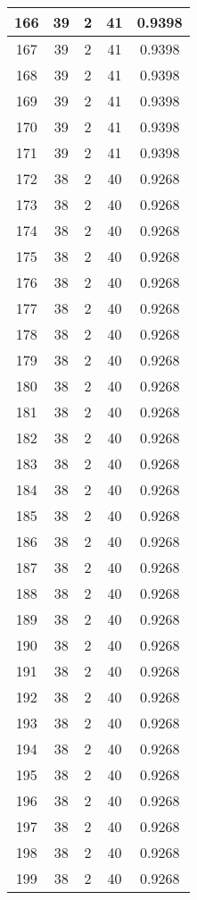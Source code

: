 \documentclass[letterpaper, 12pt]{article}
\begin{document}
\begin{longtable}{|c|c|c|c|c|}
\hline
166 & 39 & 2 & 41 & 0.9398 \\
\hline
167 & 39 & 2 & 41 & 0.9398 \\
\hline
168 & 39 & 2 & 41 & 0.9398 \\
\hline
169 & 39 & 2 & 41 & 0.9398 \\
\hline
170 & 39 & 2 & 41 & 0.9398 \\
\hline
171 & 39 & 2 & 41 & 0.9398 \\
\hline
172 & 38 & 2 & 40 & 0.9268 \\
\hline
173 & 38 & 2 & 40 & 0.9268 \\
\hline
174 & 38 & 2 & 40 & 0.9268 \\
\hline
175 & 38 & 2 & 40 & 0.9268 \\
\hline
176 & 38 & 2 & 40 & 0.9268 \\
\hline
177 & 38 & 2 & 40 & 0.9268 \\
\hline
178 & 38 & 2 & 40 & 0.9268 \\
\hline
179 & 38 & 2 & 40 & 0.9268 \\
\hline
180 & 38 & 2 & 40 & 0.9268 \\
\hline
181 & 38 & 2 & 40 & 0.9268 \\
\hline
182 & 38 & 2 & 40 & 0.9268 \\
\hline
183 & 38 & 2 & 40 & 0.9268 \\
\hline
184 & 38 & 2 & 40 & 0.9268 \\
\hline
185 & 38 & 2 & 40 & 0.9268 \\
\hline
186 & 38 & 2 & 40 & 0.9268 \\
\hline
187 & 38 & 2 & 40 & 0.9268 \\
\hline
188 & 38 & 2 & 40 & 0.9268 \\
\hline
189 & 38 & 2 & 40 & 0.9268 \\
\hline
190 & 38 & 2 & 40 & 0.9268 \\
\hline
191 & 38 & 2 & 40 & 0.9268 \\
\hline
192 & 38 & 2 & 40 & 0.9268 \\
\hline
193 & 38 & 2 & 40 & 0.9268 \\
\hline
194 & 38 & 2 & 40 & 0.9268 \\
\hline
195 & 38 & 2 & 40 & 0.9268 \\
\hline
196 & 38 & 2 & 40 & 0.9268 \\
\hline
197 & 38 & 2 & 40 & 0.9268 \\
\hline
198 & 38 & 2 & 40 & 0.9268 \\
\hline
199 & 38 & 2 & 40 & 0.9268 \\
\hline
\end{longtable}
\end{document}
